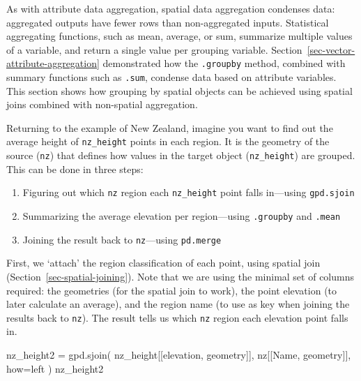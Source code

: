 \documentclass[
  letterpaper,
]{krantz}
\newenvironment{Shaded}{\begin{snugshade}}{\end{snugshade}}
\newcommand{\NormalTok}[1]{\textcolor[rgb]{0.00,0.23,0.31}{#1}}
\newcommand{\OperatorTok}[1]{\textcolor[rgb]{0.37,0.37,0.37}{#1}}
\newcommand{\StringTok}[1]{\textcolor[rgb]{0.13,0.47,0.30}{#1}}
\providecommand{\tightlist}{%
  \setlength{\itemsep}{0pt}\setlength{\parskip}{0pt}}\usepackage{longtable,booktabs,array}
\begin{document}
As with attribute data aggregation, spatial data aggregation condenses
data: aggregated outputs have fewer rows than non-aggregated inputs.
Statistical aggregating functions, such as mean, average, or sum,
summarize multiple values of a variable, and return a single value per
grouping variable. Section~\ref{sec-vector-attribute-aggregation}
demonstrated how the \texttt{.groupby} method, combined with summary
functions such as \texttt{.sum}, condense data based on attribute
variables. This section shows how grouping by spatial objects can be
achieved using spatial joins combined with non-spatial aggregation.

Returning to the example of New Zealand, imagine you want to find out
the average height of \texttt{nz\_height} points in each region. It is
the geometry of the source (\texttt{nz}) that defines how values in the
target object (\texttt{nz\_height}) are grouped. This can be done in
three steps:

\begin{enumerate}
\def\labelenumi{\arabic{enumi}.}
\tightlist
\item
  Figuring out which \texttt{nz} region each \texttt{nz\_height} point
  falls in---using \texttt{gpd.sjoin}
\item
  Summarizing the average elevation per region---using \texttt{.groupby}
  and \texttt{.mean}
\item
  Joining the result back to \texttt{nz}---using \texttt{pd.merge}
\end{enumerate}

First, we `attach' the region classification of each point, using
spatial join (Section~\ref{sec-spatial-joining}). Note that we are using
the minimal set of columns required: the geometries (for the spatial
join to work), the point elevation (to later calculate an average), and
the region name (to use as key when joining the results back to
\texttt{nz}). The result tells us which \texttt{nz} region each
elevation point falls in.

\begin{Shaded}
\begin{Highlighting}[]
\NormalTok{nz\_height2 }\OperatorTok{=}\NormalTok{ gpd.sjoin(}
\NormalTok{  nz\_height[[}\StringTok{\textquotesingle{}elevation\textquotesingle{}}\NormalTok{, }\StringTok{\textquotesingle{}geometry\textquotesingle{}}\NormalTok{]], }
\NormalTok{  nz[[}\StringTok{\textquotesingle{}Name\textquotesingle{}}\NormalTok{, }\StringTok{\textquotesingle{}geometry\textquotesingle{}}\NormalTok{]], }
\NormalTok{  how}\OperatorTok{=}\StringTok{\textquotesingle{}left\textquotesingle{}}
\NormalTok{)}
\NormalTok{nz\_height2}
\end{Highlighting}
\end{Shaded}
\end{document}
